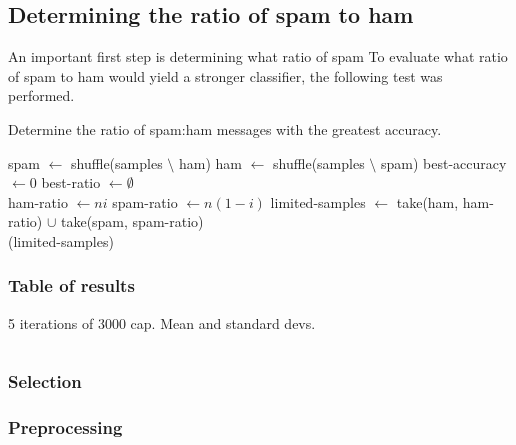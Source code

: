 \documentclass[draft,10pt]{article}
\begin{document}
\subsection{Determining the ratio of spam to ham}
An important first step is determining what ratio of spam
To evaluate what ratio of spam to ham would yield a stronger classifier, the
following test was performed.

\begin{algorithm}[b]
  \caption{Determine the ratio of spam:ham messages with the greatest accuracy.}
  \begin{algorithmic}
    \State spam $\gets$ {\sc shuffle}(samples $\setminus $ ham)
    \State ham $\gets$ {\sc shuffle}(samples $\setminus $ spam)
    \State best-accuracy $\gets 0$
    \State best-ratio $\gets \emptyset$
    \\

    \State ham-ratio $\gets ni$
    \State spam-ratio $\gets n(1 - i)$
    \State limited-samples $\gets$ {\sc take}(ham, ham-ratio) $\cup$ {\sc take}(spam, spam-ratio)
    \\

    (limited-samples)

    \EndIf
    \EndFor
    \State {}
    \EndFunction
  \end{algorithmic}\label{algo}
\end{algorithm}
\subsubsection{Table of results}
\label{sec-2-2-1}

5 iterations of 3000 cap. Mean and standard devs.
\begin{tabular}{lllllllllllllll}
\end{tabular}
\subsubsection{Selection}
\label{sec-2-2-2}
\subsubsection{Preprocessing}
\label{sec-2-2-3}
\end{document}
